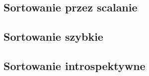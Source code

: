 \subsection{Sortowanie przez scalanie}


\subsection{Sortowanie szybkie}


\subsection{Sortowanie introspektywne}

